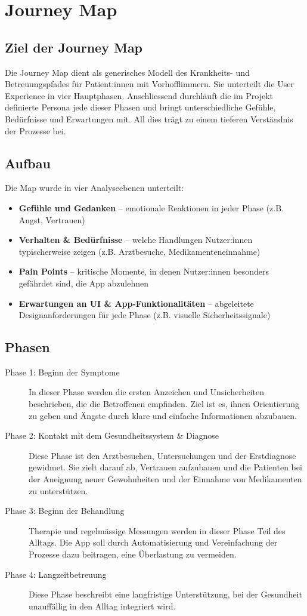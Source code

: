 \section{Journey Map}
\subsection{Ziel der Journey Map}
Die Journey Map dient als generisches Modell des Krankheits- und Betreuungspfades für Patient:innen mit Vorhofflimmern. 
Sie unterteilt die User Experience in vier Hauptphasen. Anschliessend durchläuft die im Projekt definierte Persona jede dieser Phasen 
und bringt unterschiedliche Gefühle, Bedürfnisse und Erwartungen mit. 
All dies trägt zu einem tieferen Verständnis der Prozesse bei.

\subsection{Aufbau}
Die Map wurde in vier Analyseebenen unterteilt:
\begin{itemize}
	\item \textbf{Gefühle und Gedanken} -- emotionale Reaktionen in jeder Phase (z.B. Angst, Vertrauen)
	\item \textbf{Verhalten \& Bedürfnisse} -- welche Handlungen Nutzer:innen typischerweise zeigen (z.B. Arztbesuche, Medikamenteneinnahme)
	\item \textbf{Pain Points} -- kritische Momente, in denen Nutzer:innen besonders gefährdet sind, die App abzulehnen
	\item \textbf{Erwartungen an UI \& App-Funktionalitäten} -- abgeleitete Designanforderungen für jede Phase (z.B. visuelle Sicherheitssignale)
\end{itemize}

\subsection{Phasen}
\begin{description}
	\item[Phase 1: Beginn der Symptome]
	In dieser Phase werden die ersten Anzeichen und Unsicherheiten beschrieben, die die Betroffenen empfinden. 
	Ziel ist es, ihnen Orientierung zu geben und Ängste durch klare und einfache Informationen abzubauen.
	
	\item[Phase 2: Kontakt mit dem Gesundheitssystem \& Diagnose]
	Diese Phase ist den Arztbesuchen, Untersuchungen und der Erstdiagnose gewidmet. 
	Sie zielt darauf ab, Vertrauen aufzubauen und die Patienten bei der Aneignung neuer Gewohnheiten und der Einnahme von Medikamenten zu unterstützen.
	
	\item[Phase 3: Beginn der Behandlung]
	Therapie und regelmässige Messungen werden in dieser Phase Teil des Alltags. 
	Die App soll durch Automatisierung und Vereinfachung der Prozesse dazu beitragen, eine Überlastung zu vermeiden.
	
	\item[Phase 4: Langzeitbetreuung]
	Diese Phase beschreibt eine langfristige Unterstützung, bei der Gesundheit unauffällig in den Alltag integriert wird.
\end{description}
\newpage